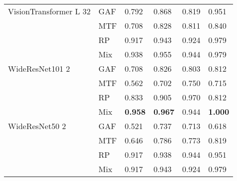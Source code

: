 \begin{longtable}[t]{llllll}
VisionTransformer L 32 & GAF & 0.792 & 0.868 & 0.819 & 0.951 \\
 & MTF & 0.708 & 0.828 & 0.811 & 0.840 \\
 & RP & 0.917 & 0.943 & 0.924 & 0.979 \\
 & Mix & 0.938 & 0.955 & 0.944 & 0.979 \\
WideResNet101 2 & GAF & 0.708 & 0.826 & 0.803 & 0.812 \\
 & MTF & 0.562 & 0.702 & 0.750 & 0.715 \\
 & RP & 0.833 & 0.905 & 0.970 & 0.812 \\
 & Mix & \textbf{0.958} & \textbf{0.967} & 0.944 & \textbf{1.000} \\
WideResNet50 2 & GAF & 0.521 & 0.737 & 0.713 & 0.618 \\
 & MTF & 0.646 & 0.786 & 0.773 & 0.819 \\
 & RP & 0.917 & 0.938 & 0.944 & 0.951 \\
 & Mix & 0.917 & 0.943 & 0.924 & 0.979 \\
\end{longtable}
